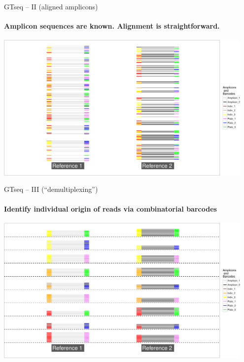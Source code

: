 \documentclass[letter,graphicx]{beamer}
\begin{document}
\begin{frame}{GTseq -- II (aligned amplicons)}
\framesubtitle{Amplicon sequences are known. Alignment is straightforward.}
\begin{center}
\includegraphics[width=0.95\textwidth]{mhap_figs/gtseq-amps-crop.pdf}
\end{center}
\end{frame}



\begin{frame}{GTseq -- III (``demultiplexing'')}
\framesubtitle{Identify individual origin of reads via combinatorial barcodes}
\begin{center}
\includegraphics[width=0.95\textwidth]{mhap_figs/gtseq-demultiplexed-crop.pdf}
\end{center}
\end{frame}
\end{document}
